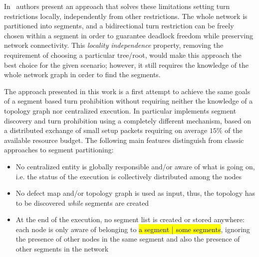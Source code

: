 In~\cite{mejia_ipdps06} authors present an approach that solves these
limitations setting turn restrictions locally,
independently from other restrictions. The whole network is
partitioned into segments, and a bidirectional turn
restriction can be freely chosen within a segment in order to guarantee
deadlock freedom while preserving network connectivity. This \emph{locality
independence} property, removing the requirement of choosing a particular tree/root,
would make this approach the best choice for the given scenario;
however, it still requires the knowledge of the
whole network graph in order to find the segments.

The \disr{} approach presented in this work is a first attempt to
achieve the same goals of a segment based turn prohibition without
requiring neither the knowledge of a topology graph nor centralized execution. In particular
\disr{} implements segment discovery and turn prohibition using a
completely different mechanism, based on a distributed exchange of
small setup packets requiring on average $15\%$ of the available
resource budget. The following main features distinguish \disr{}
from classic approaches to segment partitioning: 
\begin{itemize}
\item No centralized entity is globally responsible and/or aware of
what is going on, i.e. the status of the \disr{} execution is
collectively distributed among the nodes
\item  No defect map and/or topology graph is used as input,
thus, the topology has to be discovered \emph{while} segments are
created
\item At the end of the execution, no segment list is created or
stored anywhere: each node is only aware of belonging to \hl{a segment | some segments},
ignoring the presence of other nodes in the same segment and also the
presence of other segments in the network
\end{itemize}


